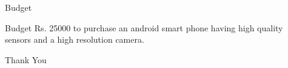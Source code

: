 \documentclass{beamer}
\begin{document}
\begin{frame}{Budget}{}
\begin{block}{Budget}
Rs. 25000 to purchase an android smart phone having high quality sensors and a high resolution camera.
\end{block}
  \note{\textcolor{red}{Kartikeya\\}}
\end{frame}


\begin{frame}
\vfill
\begin{center}
\huge{Thank You}
\end{center}
\vfill
{}
\end{frame}




\end{document}
